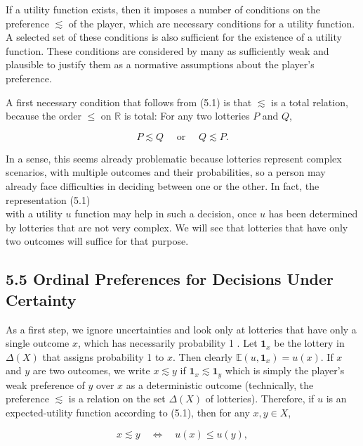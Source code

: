 \documentclass[12pt]{article}
\begin{document}
If a utility function exists, then it imposes a number of conditions on the preference $\lesssim$ of the player, which are necessary conditions for a utility function. A selected set of these conditions is also sufficient for the existence of a utility function. These conditions are considered by many as sufficiently weak and plausible to justify them as a normative assumptions about the player's preference.

A first necessary condition that follows from (5.1) is that $\lesssim$ is a total relation, because the order $\leq$ on $\mathbb{R}$ is total: For any two lotteries $P$ and $Q$,


\begin{equation*}
P \lesssim Q \quad \text { or } \quad Q \lesssim P . \tag{5.7}
\end{equation*}


In a sense, this seems already problematic because lotteries represent complex scenarios, with multiple outcomes and their probabilities, so a person may already face difficulties in deciding between one or the other. In fact, the representation (5.1)\\
with a utility $u$ function may help in such a decision, once $u$ has been determined by lotteries that are not very complex. We will see that lotteries that have only two outcomes will suffice for that purpose.

\subsection*{5.5 Ordinal Preferences for Decisions Under Certainty}
As a first step, we ignore uncertainties and look only at lotteries that have only a single outcome $x$, which has necessarily probability 1 . Let $\mathbf{1}_{x}$ be the lottery in $\Delta(X)$ that assigns probability 1 to $x$. Then clearly $\mathbb{E}\left(u, \mathbf{1}_{x}\right)=u(x)$. If $x$ and $y$ are two outcomes, we write $x \lesssim y$ if $\mathbf{1}_{x} \lesssim \mathbf{1}_{y}$ which is simply the player's weak preference of $y$ over $x$ as a deterministic outcome (technically, the preference $\lesssim$ is a relation on the set $\Delta(X)$ of lotteries). Therefore, if $u$ is an expected-utility function according to (5.1), then for any $x, y \in X$,


\begin{equation*}
x \lesssim y \quad \Leftrightarrow \quad u(x) \leq u(y), \tag{5.8}
\end{equation*}
\end{document}
